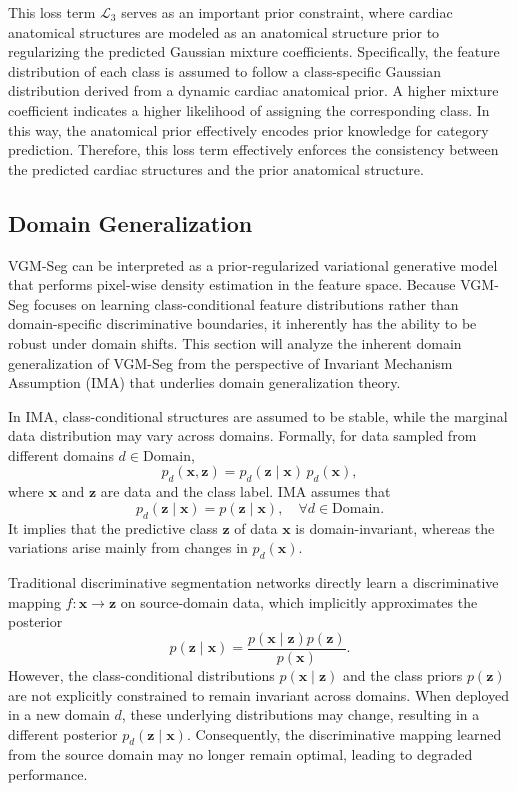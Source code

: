 \documentclass[preprint,12pt]{elsarticle}
\begin{document}
This loss term $\mathcal{L}_3$ serves as an important prior constraint, where cardiac anatomical structures are modeled as an anatomical structure prior to regularizing the predicted Gaussian mixture coefficients. Specifically, the feature distribution of each class is assumed to follow a class-specific Gaussian distribution derived from a dynamic cardiac anatomical prior. A higher mixture coefficient indicates a higher likelihood of assigning the corresponding class. In this way, the anatomical prior effectively encodes prior knowledge for category prediction. Therefore, this loss term effectively enforces the consistency between the predicted cardiac structures and the prior anatomical structure.


\subsection{Domain Generalization}
\label{sec:DG}
VGM-Seg can be interpreted as a prior-regularized variational generative model that performs pixel-wise density estimation in the feature space. Because VGM-Seg focuses on learning class-conditional feature distributions rather than domain-specific discriminative boundaries, it inherently has the ability to be robust under domain shifts.
%
This section will analyze the inherent domain generalization of VGM-Seg from the perspective of Invariant Mechanism Assumption (IMA)\cite{Peter2016Causal} that underlies domain generalization theory.

In IMA, class-conditional structures are assumed to be stable, while the marginal data distribution may vary across domains.
Formally, for data sampled from different domains $d \in \text{Domain}$,
\begin{equation}
p_d(\mathbf{x}, \mathbf{z}) = p_d(\mathbf{z} \mid \mathbf{x})\, p_d(\mathbf{x}),
\end{equation}
where $\mathbf{x}$ and $\mathbf{z}$ are data and the class label. IMA assumes that
\[
p_d(\mathbf{z} \mid \mathbf{x}) = p(\mathbf{z} \mid \mathbf{x}), \quad \forall d \in \text{Domain}.
\]
It implies that the predictive class $\mathbf{z}$ of data $\mathbf{x}$ is domain-invariant, whereas the variations arise mainly from changes in $p_d(\mathbf{x})$.


Traditional discriminative segmentation networks directly learn a discriminative mapping $f: \mathbf{x} \rightarrow \mathbf{z}$ on source-domain data, which implicitly approximates the posterior
\[
p(\mathbf{z} \mid \mathbf{x}) = \frac{p(\mathbf{x} \mid \mathbf{z})p(\mathbf{z})}{p(\mathbf{x})}.
\]
However, the class-conditional distributions $p(\mathbf{x} \mid \mathbf{z})$ and the class priors 
$p(\mathbf{z})$ are not explicitly constrained to remain invariant across domains.
When deployed in a new domain $d$, these underlying distributions may change, resulting in a different posterior $p_d(\mathbf{z} \mid \mathbf{x})$. Consequently, the discriminative mapping learned from the source domain may no longer remain optimal, leading to degraded performance. 
\end{document}
